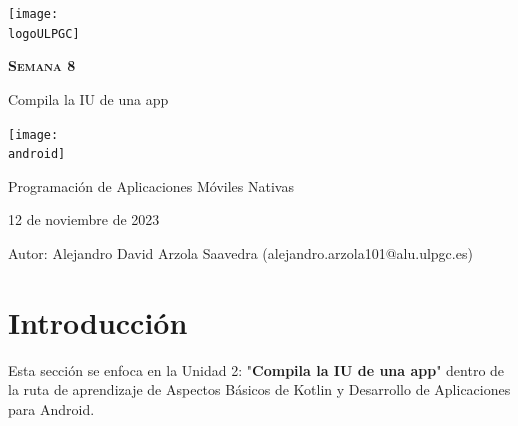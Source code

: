 \documentclass[a4paper]{article}
\newcommand{\dateToday}{12 de noviembre de 2023}
\newcommand{\logoULPGC}{imagenes/ulpgc.png}
\newcommand{\android}{imagenes/android.png}
\begin{document}
    \begin{titlepage}
        \centering
        \vspace*{2cm}
        \texttt{[image: \\logoULPGC]}\par\vspace{1cm}
    
        {\scshape\textbf{\LARGE Semana 8}}\par
        \vspace{0.6cm}
        {\bfseries}{\Huge Compila la IU de una app}
        \vspace{2cm}
    
        \centering
        \texttt{[image: \\android]}
        \vspace{0.5cm}\vspace{0.5cm}
        \begin{tcolorbox}[colback=red!5!white,colframe=white!50!black]
            \centering \Large Programación de Aplicaciones Móviles Nativas \par
            \dateToday
        \end{tcolorbox}

        \vspace{1cm}        
        \begin{tcolorbox}[colback=blue!5!white,colframe=blue!75!black]
            Autor:
            \tcblower
            Alejandro David Arzola Saavedra (alejandro.arzola101@alu.ulpgc.es)
        \end{tcolorbox}
    \end{titlepage}
    
    \newpage
        
    \tableofcontents 
    
    \newpage

    \section{Introducción}

     Esta sección se enfoca en la Unidad 2: "\textbf{Compila la IU de una app}" dentro de la ruta de aprendizaje de Aspectos Básicos de Kotlin y Desarrollo de Aplicaciones para Android. \vspace{0.3cm}
    
\end{document}
